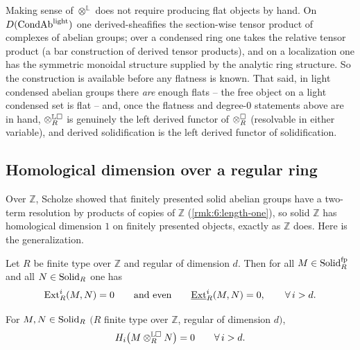 \begin{remark}
\label{rmk:11:derived-tensor-def}
Making sense of $\otimes^{\mathbb{L}}$ does not require producing flat objects
by hand. On $D(\mathrm{CondAb}^{\mathrm{light}})$ one derived-sheafifies the section-wise tensor
product of complexes of abelian groups; over a condensed ring one takes the
relative tensor product (a bar construction of derived tensor products), and on
a localization one has the symmetric monoidal structure supplied by the
analytic ring structure. So the construction is available before any flatness
is known. That said, in light condensed abelian groups there \emph{are} enough
flats -- the free object on a light condensed set is flat -- and, once the
flatness and degree-$0$ statements above are in hand, $\otimes^{\mathbb{L}
\square}_{R}$ is genuinely the left derived functor of $\otimes^{\square}_{R}$
(resolvable in either variable), and derived solidification is the left derived
functor of solidification.
\end{remark}

\subsection{Homological dimension over a regular ring}

Over $\mathbb{Z}$, Scholze showed that finitely presented solid abelian groups
have a two-term resolution by products of copies of $\mathbb{Z}$
(\cref{rmk:6:length-one}), so solid $\mathbb{Z}$ has homological dimension $1$
on finitely presented objects, exactly as $\mathbb{Z}$ does. Here is the
generalization.

\begin{theorem}
\label{thm:11:regular-ext}
Let $R$ be finite type over $\mathbb{Z}$ and regular of dimension $d$. Then for
all $M\in\mathrm{Solid}_{R}^{\mathrm{fp}}$ and all $N\in\mathrm{Solid}_{R}$ one has
\begin{equation*}
\operatorname{Ext}^{i}_{R}(M,N)=0\qquad\text{and even}\qquad \underline{\operatorname{Ext}}^{i}_{R}(M,N)=0,\qquad
\forall\,i>d.
\end{equation*}
\end{theorem}

\begin{corollary}
\label{cor:11:tor-bound}
For $M,N\in\mathrm{Solid}_{R}$ $(R$ finite type over $\mathbb{Z}$, regular of dimension
$d)$,
\begin{equation*}
H_{i}\bigl(M\otimes^{\mathbb{L}\square}_{R}N\bigr)=0\qquad\forall\,i>d.
\end{equation*}
\end{corollary}

